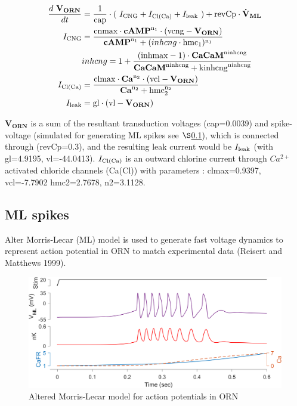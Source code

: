 \documentclass[
]{article}
\begin{document}
\begin{equation}
\begin{split}
\frac{d\ \mathbf{V_{ORN}}}{dt} &= \frac{1}{\rm cap} \cdot (\ I_{\rm CNG} + I_{\rm Cl(Ca)} + I_{\rm leak}\ ) + {\rm revCp} \cdot \mathbf{\dot{V}_{ML}} \\
I_{\rm CNG} &= \frac{{\rm cnmax} \cdot \mathbf{cAMP}^{\rm n_1} \cdot ({\rm vcng}-\mathbf{V_{ORN}})}{\mathbf{cAMP}^{\rm n_1} + (inhcng \cdot {\rm hmc_1})^{\rm n_1}} \\
& inhcng = 1 + \frac{({\rm inhmax}-1)\cdot \mathbf{CaCaM}^{\rm ninhcng}}{\mathbf{CaCaM}^{\rm ninhcng} + {\rm kinhcng}^{\rm ninhcng}} \\
I_{\rm Cl(Ca)} &= \frac{{\rm clmax} \cdot \mathbf{Ca}^{\rm n_2} \cdot ({\rm vcl} - \mathbf{V_{ORN}})}{\mathbf{Ca}^{\rm n_2} + {\rm hmc_2^{n_2}}} \\
I_{\rm leak} &= {\rm gl} \cdot ({\rm vl} - \mathbf{V_{ORN}})
\end{split}
\end{equation}

\(\mathbf{V_{ORN}}\) is a sum of the resultant transduction voltages (cap=0.0039) and spike-voltage (simulated for generating ML spikes see \(\S\)\ref{ML}), which is connected through (revCp=0.3), and the resulting leak current would be \(I_{\rm leak}\) (with gl=4.9195, vl=-44.0413). \(I_{\rm Cl(Ca)}\) is an outward chlorine current through \(Ca^{2+}\) activated chloride channels (Ca(Cl)) with parameters : clmax=0.9397, vcl=-7.7902 hmc2=2.7678, n2=3.1128.

\hypertarget{ML}{%
\subsection{ML spikes}\label{ML}}

Alter Morris-Lecar (ML) model is used to generate fast voltage dynamics to represent action potential in ORN to match experimental data (Reisert and Matthews 1999).

\begin{figure}

{\centering \includegraphics[width=0.9\linewidth]{figs/v1/fig_ML_spikes} 

}

\caption{Altered Morris-Lecar model for action potentials in ORN}\label{fig:MLspk}
\end{figure}
\end{document}
